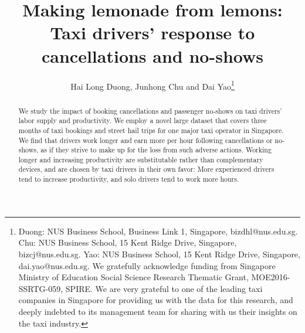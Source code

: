 \documentclass[reviewmode]{restud}
\begin{document}

\title{Making lemonade from lemons: Taxi drivers' response to cancellations and no-shows}
\author{Hai Long Duong, Junhong Chu and Dai Yao\thanks{Duong: NUS Business School, Business Link 1, Singapore, bizdhl@nus.edu.sg. Chu: NUS Business School, 15 Kent Ridge Drive, Singapore, bizcj@nus.edu.sg. Yao: NUS Business School, 15 Kent Ridge Drive, Singapore, dai.yao@nus.edu.sg. We gratefully acknowledge funding from Singapore Ministry of Education Social Science Research Thematic Grant, MOE2016-SSRTG-059, SPIRE. We are very grateful to one of the leading taxi companies in Singapore for providing us with the data for this research, and deeply indebted to its management team for sharing with us their insights on the taxi industry.}}


\begin{abstract}
	We study the impact of booking cancellations and passenger no-shows on taxi drivers' labor supply and productivity. We employ a novel large dataset that covers three months of taxi bookings and street hail trips for one major taxi operator in Singapore. We find that drivers work longer and earn more per hour following cancellations or no-shows, as if they strive to make up for the loss from such adverse actions. Working longer and increasing productivity are substitutable rather than complementary devices, and are chosen by taxi drivers in their own favor: More experienced drivers tend to increase productivity, and solo drivers tend to work more hours. 
\end{abstract}
\end{document}
